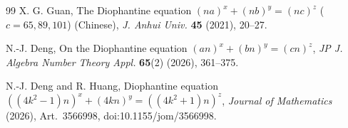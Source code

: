 \documentclass[11pt,a4paper]{article}
\theoremstyle{remark}
\begin{document}
\begin{thebibliography}{99}
 X. G. Guan, The Diophantine equation $(na)^x+(nb)^y=(nc)^z$
($c=65,89,101$) (Chinese), \emph{J. Anhui Univ.} \textbf{45} (2021), 20--27.

 N.-J. Deng, On the Diophantine equation
$(an)^x+(bn)^y=(cn)^z$, \emph{JP J. Algebra Number Theory Appl.} \textbf{65}(2)
(2026), 361--375.

 N.-J. Deng and R. Huang, Diophantine equation
$((4k^2-1)n)^x+(4kn)^y=((4k^2+1)n)^z$, \emph{Journal of Mathematics} (2026),
Art.~3566998, doi:10.1155/jom/3566998.

\end{thebibliography}
\end{document}
